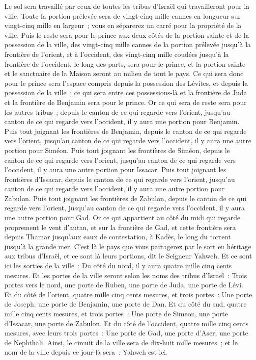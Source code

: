 \begin{multicols}{2}
Le sol sera travaillé par ceux de toutes les tribus d'Israël qui travailleront pour la ville.
Toute la portion prélevée sera de vingt-cinq mille cannes en longueur sur vingt-cinq mille en largeur~; vous en séparerez un carré pour la propriété de la ville.
Puis le reste sera pour le prince aux deux côtés de la portion sainte et de la possession de la ville, des vingt-cinq mille cannes de la portion prélevée jusqu'à la frontière de l'orient, et à l'occident, des vingt-cinq mille coudées jusqu'à la frontière de l'occident, le long des parts, sera pour le prince, et la portion sainte et le sanctuaire de la Maison seront au milieu de tout le pays.
Ce qui sera donc pour le prince sera l'espace compris depuis la possession des Lévites, et depuis la possession de la ville~; ce qui sera entre ces possessions-là et la frontière de Juda et la frontière de Benjamin sera pour le prince.
Or ce qui sera de reste sera pour les autres tribus~; depuis le canton de ce qui regarde vers l'orient, jusqu'au canton de ce qui regarde vers l'occident, il y aura une portion pour Benjamin.
Puis tout joignant les frontières de Benjamin, depuis le canton de ce qui regarde vers l'orient, jusqu'au canton de ce qui regarde vers l'occident, il y aura une autre portion pour Siméon.
Puis tout joignant les frontières de Siméon, depuis le canton de ce qui regarde vers l'orient, jusqu'au canton de ce qui regarde vers l'occident, il y aura une autre portion pour Issacar.
Puis tout joignant les frontières d'Issacar, depuis le canton de ce qui regarde vers l'orient, jusqu'au canton de ce qui regarde vers l'occident, il y aura une autre portion pour Zabulon.
Puis tout joignant les frontières de Zabulon, depuis le canton de ce qui regarde vers l'orient, jusqu'au canton de ce qui regarde vers l'occident, il y aura une autre portion pour Gad.
Or ce qui appartient au côté du midi qui regarde proprement le vent d'autan, et sur la frontière de Gad, et cette frontière sera depuis Thamar jusqu'aux eaux de contestation, à Kadès, le long du torrent jusqu'à la grande mer.
C'est là le pays que vous partagerez par le sort en héritage aux tribus d'Israël, et ce sont là leurs portions, dit le Seigneur Yahweh.
Et ce sont ici les sorties de la ville~: Du côté du nord, il y aura quatre mille cinq cents mesures.
Et les portes de la ville seront selon les noms des tribus d'Israël~: Trois portes vers le nord, une porte de Ruben, une porte de Juda, une porte de Lévi.
Et du côté de l'orient, quatre mille cinq cents mesures, et trois portes~: Une porte de Joseph, une porte de Benjamin, une porte de Dan.
Et du côté du sud, quatre mille cinq cents mesures, et trois portes~: Une porte de Simeon, une porte d'Issacar, une porte de Zabulon.
Et du côté de l'occident, quatre mille cinq cents mesures, avec leurs trois portes~: Une porte de Gad, une porte d'Aser, une porte de Nephthali.
Ainsi, le circuit de la ville sera de dix-huit mille mesures~; et le nom de la ville depuis ce jour-là sera~: Yahweh est ici.
\PPE{}
\end{multicols}
